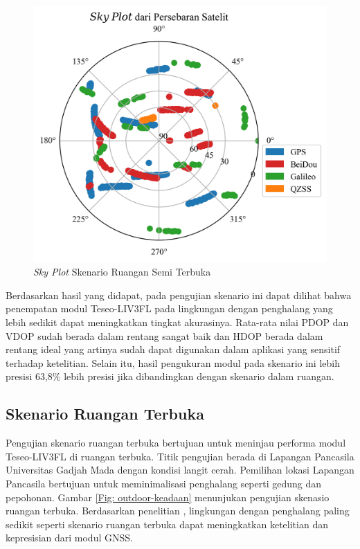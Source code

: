 \begin{figure}[H]
	\centering
	\captionsetup{justification=centering}
	\includegraphics[width=12cm]{contents/chapter-4/3-skenario-semioutdoor/sky_plot.png}
	\caption{\textit{Sky Plot} Skenario Ruangan Semi Terbuka}
	\label{Fig: semioutdoor-sky_plot}
\end{figure}

Berdasarkan hasil yang didapat, pada pengujian skenario ini dapat dilihat bahwa penempatan modul Teseo-LIV3FL pada lingkungan dengan penghalang yang lebih sedikit dapat meningkatkan tingkat akurasinya. Rata-rata nilai PDOP dan VDOP sudah berada dalam rentang sangat baik dan HDOP berada dalam rentang ideal yang artinya sudah dapat digunakan dalam aplikasi yang sensitif terhadap ketelitian. Selain itu, hasil pengukuran modul pada skenario ini lebih presisi 63,8\% lebih presisi jika dibandingkan dengan skenario dalam ruangan.

\subsection{Skenario Ruangan Terbuka}
Pengujian skenario ruangan terbuka bertujuan untuk meninjau performa modul Teseo-LIV3FL di ruangan terbuka. Titik pengujian berada di Lapangan Pancasila Universitas Gadjah Mada dengan kondisi langit cerah. Pemilihan lokasi Lapangan Pancasila bertujuan untuk meminimalisasi penghalang seperti gedung dan pepohonan. Gambar \ref{Fig: outdoor-keadaan} menunjukan pengujian skenasio ruangan terbuka. Berdasarkan penelitian \cite{Lu2018}, lingkungan dengan penghalang paling sedikit seperti skenario ruangan terbuka dapat meningkatkan ketelitian dan kepresisian dari modul GNSS.

